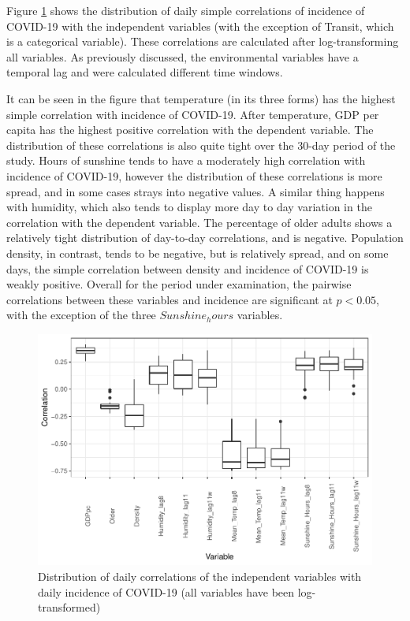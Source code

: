\documentclass[]{elsarticle} %
\makeatletter
\def\maxwidth{\ifdim\Gin@nat@width>\linewidth\linewidth
\else\Gin@nat@width\fi}
\let\Oldincludegraphics\includegraphics
\renewcommand{\includegraphics}[1]{\Oldincludegraphics[width=\maxwidth]{#1}}
\makeatother
\begin{document}
Figure \ref{fig:daily-correlations} shows the distribution of daily
simple correlations of incidence of COVID-19 with the independent
variables (with the exception of Transit, which is a categorical
variable). These correlations are calculated after log-transforming all
variables. As previously discussed, the environmental variables have a
temporal lag and were calculated different time windows.

It can be seen in the figure that temperature (in its three forms) has
the highest simple correlation with incidence of COVID-19. After
temperature, GDP per capita has the highest positive correlation with
the dependent variable. The distribution of these correlations is also
quite tight over the 30-day period of the study. Hours of sunshine tends
to have a moderately high correlation with incidence of COVID-19,
however the distribution of these correlations is more spread, and in
some cases strays into negative values. A similar thing happens with
humidity, which also tends to display more day to day variation in the
correlation with the dependent variable. The percentage of older adults
shows a relatively tight distribution of day-to-day correlations, and is
negative. Population density, in contrast, tends to be negative, but is
relatively spread, and on some days, the simple correlation between
density and incidence of COVID-19 is weakly positive. Overall for the
period under examination, the pairwise correlations between these
variables and incidence are significant at \(p<0.05\), with the
exception of the three \(Sunshine_hours\) variables.

\begin{figure}
\centering
\includegraphics{Environmental-Correlates-of-COVID19-Spain_files/figure-latex/daily-correlations-1.pdf}
\caption{\label{fig:daily-correlations}Distribution of daily
correlations of the independent variables with daily incidence of
COVID-19 (all variables have been log-transformed)}
\end{figure}
\end{document}
